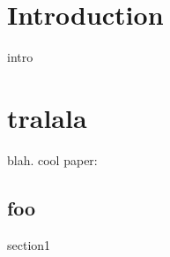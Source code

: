 






\chapter{Introduction}

intro



\chapter{tralala}

blah. cool paper: \cite{lattice77}

\section{foo}
section1


\singlespacing




